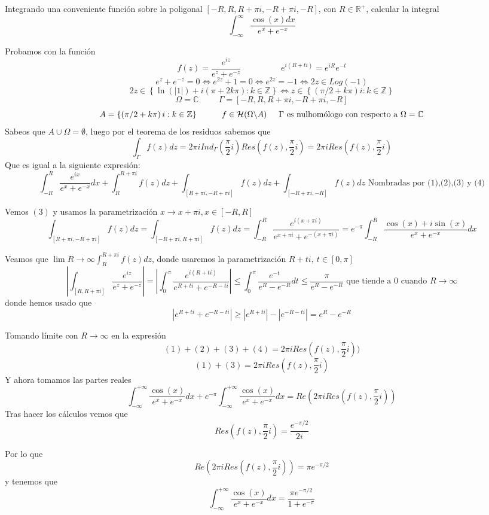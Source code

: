 \begin{ejer}
	Integrando una conveniente función sobre la poligonal $[-R,R,R+\pi i,-R+\pi i, -R]$, con $R\in\mathbb{R}^+$, calcular la integral
	$$ \int_{-\infty}^{\infty} \frac{\cos(x)dx}{e^x+e^{-x}} $$
\end{ejer}
\begin{sol}


Probamos con la función
$$ f(z) = \frac{e^{iz}}{e^z+e^{-z}} \hspace{2cm} e^{i(R+ti)} = e^{iR}e^{-t} $$
$$ e^z+e^{-z} =0\Longleftrightarrow  e^{2z}+1=0 \Longleftrightarrow e^{2z}=-1 \Longleftrightarrow 2z\in Log(-1) $$
$$ 2z\in\left\{ \ln(|1|) + i(\pi+2k\pi) : k\in\mathbb{Z} \right\} \Longleftrightarrow z\in\left\{ (\pi/2+k\pi)i : k\in\mathbb{Z} \right\} $$
$$ \Omega=\mathbb{C} \hspace{1cm} \Gamma = [ -R,R,R+\pi i, -R+\pi i, -R ] $$
$$ A = \left\{ \left( \pi/2 +k\pi \right)i : k\in\mathbb{Z} \right\} \hspace{1cm} f\in\mathcal{H}(\Omega\backslash A) \hspace{0.5cm} \Gamma \text{ es nulhomólogo con respecto a }\Omega=\mathbb{C} $$
Sabeos que $A\cup\Omega = \emptyset$, luego por el teorema de los residuos sabemos que
$$ \int_{\Gamma} f(z)dz = 2\pi iInd_{\Gamma}(\frac{\pi}{2}i) Res(f(z), \frac{\pi}{2}i) = 2\pi i Res(f(z), \frac{\pi}{2}i)$$
Que es igual a la siguiente expresión:
$$ \int_{-R}^{R} \frac{e^{ix}}{e^x+e^{-x}} dx + \int_{R}^{R+\pi i} f(z)dz + \int_{[R+\pi i,-R+\pi i]} f(z)dz + \int_{[-R+\pi i, -R]} f(z)dz \text{ Nombradas por (1),(2),(3) y (4)} $$

Vemos $(3)$ y usamos la parametrización $x\rightarrow x+\pi i, x\in[-R,R]$
$$ \int_{[R+\pi i,-R+\pi i]} f(z)dz = \int_{[-R+\pi i,R+\pi i]} f(z)dz = \int_{-R}^{R} \frac{e^{i(x+\pi i)}}{e^{x+\pi i}+e^{-(x+\pi i)}} = e^{-\pi} \int_{-R}^{R} \frac{\cos(x)+i\sin(x)}{e^x+e^{-x}}dx $$

Veamos que $\lim{R\rightarrow\infty} \int_{R}^{R+\pi i} f(z)dz$, donde usaremos la parametrización $R+ti, \ t\in[0,\pi]$
$$ \left| \int_{[R,R+\pi i]} \frac{e^{iz}}{e^z+e^{-z}} \right|  = \left| \int_{0}^{\pi} \frac{e^{i(R+ti)}}{e^{R+ti}+e^{-R-ti}} \right| \leq \int_{0}^{\pi} \frac{e^{-t}}{e^R-e^{-R}}dt \leq \frac{\pi}{e^R-e^{-R}} \text{ que tiende a $0$ cuando $R \rightarrow\infty$}$$
donde hemos usado que
$$ | e^{R+ti}+e^{-R-ti} | \geq |e^{R+ti}|-|e^{-R-ti}| = e^R-e^{-R} $$

Tomando límite con $R\rightarrow\infty$ en la expresión
$$ (1)+(2)+(3)+(4) = 2\pi i Res(f(z),\frac{\pi}{2}i)) $$
$$ (1)+(3) = 2\pi iRes(f(z),\frac{\pi}{2}i) $$
Y ahora tomamos las partes reales
$$ \int_{-\infty}^{+\infty} \frac{\cos(x)}{e^x+e^{-x}} dx + e^{-\pi} \int_{-\infty}^{+\infty} \frac{\cos(x)}{e^x+e^{-x}}dx = Re(2\pi iRes(f(z), \frac{\pi}{2}i)) $$
Tras hacer los cálculos vemos que
$$ Res(f(z),\frac{\pi}{2}i) = \frac{e^{-\pi/2}}{2i}  $$

Por lo que 
$$ Re(2\pi iRes(f(z), \frac{\pi}{2}i)) = \pi e^{-\pi/2} $$
y tenemos que
$$ \int_{-\infty}^{+\infty} \frac{\cos(x)}{e^x+e^{-x}} dx = \frac{\pi e^{-\pi/2}}{1+e^{-\pi}} $$
\end{sol}



